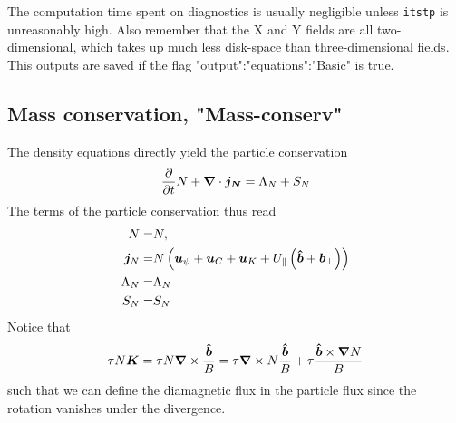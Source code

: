 The computation time spent on diagnostics is usually negligible unless {\tt itstp}
is unreasonably high. Also remember that the X and Y fields are all
two-dimensional, which takes up much less disk-space than three-dimensional
fields. This outputs are saved if the flag "output":"equations":"Basic" is true.

\subsection{Mass conservation, "Mass-conserv"}
The density equations directly yield the particle conservation
\begin{align} \label{eq:mass_theorem}
  \frac{\partial}{\partial t} N
  + {\boldsymbol{\nabla}}\cdot{\boldsymbol{ j_{N}}}
  =  \Lambda_{N}+S_{N}
\end{align}
The terms of the particle conservation thus read
\begin{align}
  N= & N,\\
  {\boldsymbol{j}}_{N} =& N\left(
  {\boldsymbol{u}}_\psi + {\boldsymbol{u}}_C + {\boldsymbol{u}}_{K} +U_\parallel\left(\bm{\hat{b}}+{{\boldsymbol{b}}}_\perp\right)  \right)
\label{eq:particle_flux}\\
  \Lambda_{N} =& \Lambda_N
\\
  S_{N} =&  S_{N}
\end{align}
Notice that
\begin{align}
\tau N {\boldsymbol{K}} = \tau N{\boldsymbol{\nabla}}\times\frac{\bm{\hat{b}}}{B} = \tau {\boldsymbol{\nabla}}\times N\frac{\bm{\hat{b}}}{B} + \tau \frac{\bm{\hat{b}}\times{\boldsymbol{\nabla}} N}{B}
\label{}
\end{align}
such that we can define the diamagnetic flux in the particle flux since
the rotation vanishes under the divergence.

